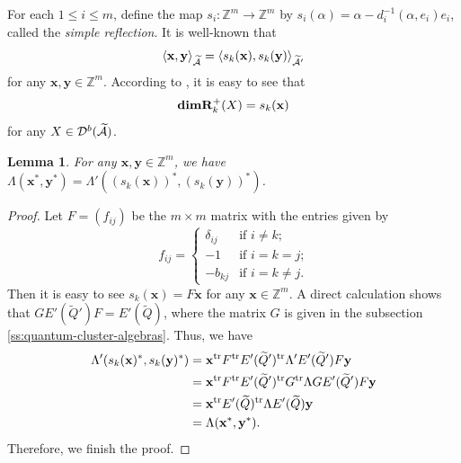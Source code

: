 \documentclass[reqno,12pt]{amsart}
\numberwithin{equation}{section}
\def\lr#1{\langle #1\rangle} \def\fin{\hfill$\square$}  \def\lra{\longrightarrow} \def\mod{\mbox{\rm \textbf{mod}}\,}\def\Mod{\mbox{\rm mod}\,}\def\top{\mbox{\rm top}\,}\def\soc{\mbox{\rm soc}\,}
\def\x{{\bf x}}
\theoremstyle{plain} %
\newtheorem{lemma}[theorem]{\bf Lemma}
\theoremstyle{definition} %
\begin{document}
For each $1\leq i\leq m$, define the map $s_i:\mathbb{Z}^m\rightarrow \mathbb{Z}^m$ by $s_i(\alpha)=\alpha-d_i^{-1}(\alpha,e_i)e_i$, called the {\em simple reflection}. It is well-known that
\begin{equation}\label{eulerequal}
\lr{{\bf x},{\bf y}}_{\widetilde{\A}}=\lr{s_k({\bf x}),s_k({\bf y})}_{\widetilde{\A'}}\end{equation} for any $\mathbf{x}, \mathbf{y}\in \mathbb{Z}^m$.
According to \cite[Proposition 2.1]{Dlab}, it is easy to see that
\begin{equation}\label{wsxlbc}
{\Dim}\mathbf{R}_k^+(X)=s_k(\x)
\end{equation}
for any $X\in \mathcal{D}^b(\widetilde{\mathcal{A}})$.

\begin{lemma}\label{lem:compatible-lambda}
For any $\mathbf{x}, \mathbf{y}\in \mathbb{Z}^m$, we have $\Lambda(\mathbf{x}^\ast,\mathbf{y}^\ast)=\Lambda'((s_k(\mathbf{x}))^\ast,(s_k(\mathbf{y}))^\ast)$.
\end{lemma}
\begin{proof}
Let  $F=(f_{ij})$  be the $m\times m$ matrix with the entries given by
\[f_{ij}=\begin{cases}
\delta_{ij} & \text{if $i\ne k$;}\\
-1 & \text{if $i=k=j$;}\\
-b_{kj} & \text{if $i=k\neq j$.}
\end{cases}
\]
Then it is easy to see $s_k(\mathbf{x})=F\mathbf{x}$ for any $\mathbf{x}\in \mathbb{Z}^m$. A direct calculation shows that $GE'(\widetilde{Q}')F=E'(\widetilde{Q})$, where the matrix $G$ is given in the subsection \ref{ss:quantum-cluster-algebras}.
Thus, we have
 \begin{align*}
     \Lambda'(s_k(\mathbf{x})^\ast, s_k(\mathbf{y})^\ast)&=\mathbf{x}^{\rm tr}F^{\rm tr} E'(\widetilde{Q}')^{\rm tr}\Lambda'E'(\widetilde{Q}')F\mathbf{y}\\
     &=\mathbf{x}^{\rm tr}F^{\rm tr} E'(\widetilde{Q}')^{\rm tr}G^{\rm tr}\Lambda GE'(\widetilde{Q}')F\mathbf{y}\\
     &=\mathbf{x}^{\rm tr}E'(\widetilde{Q})^{\rm tr}\Lambda E'(\widetilde{Q})\mathbf{y}\\
     &=\Lambda(\mathbf{x}^\ast,\mathbf{y}^\ast).
 \end{align*}
 Therefore, we finish the proof.
\end{proof}
\end{document}
